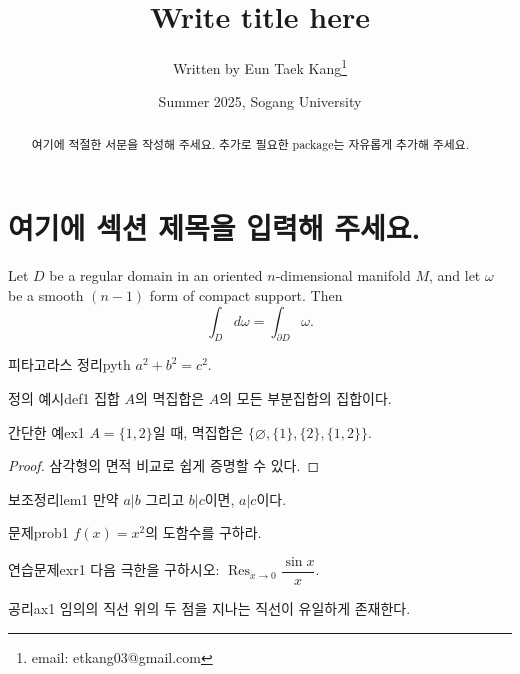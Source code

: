 \documentclass{article}
\title{\textsf{Write title here}}
\author[1]{Written by Eun Taek Kang\thanks{email: etkang03@gmail.com}}
\affil[1]{Department of Physics, Sogang University, Seoul 04107, Korea}
\date{Summer 2025, Sogang University}
\begin{document}
\pagestyle{fancy}
    \fancyhf{}
    \fancyfoot[C]{\thepage}

\maketitle

\begin{abstract}
    여기에 적절한 서문을 작성해 주세요. 추가로 필요한 package는 자유롭게 추가해 주세요.
\end{abstract}

\newpage

\section{여기에 섹션 제목을 입력해 주세요.}

\begin{theorem}{}{}
Let $D$ be a regular domain in an oriented $n$-dimensional manifold $M$, 
and let $\omega$ be a smooth $(n-1)$ form of compact support. Then
\[\int_D d\omega = \int_{\partial D} \omega.\]
\end{theorem}

\begin{theorem}{피타고라스 정리}{pyth}
$a^2+b^2=c^2$.
\end{theorem}

\begin{definition}{정의 예시}{def1}
집합 $A$의 멱집합은 $A$의 모든 부분집합의 집합이다.
\end{definition}

\begin{example}{간단한 예}{ex1}
$A=\{1,2\}$일 때, 멱집합은 $\{\varnothing,\{1\},\{2\},\{1,2\}\}$.
\end{example}

\begin{proof}
삼각형의 면적 비교로 쉽게 증명할 수 있다.
\end{proof}

\begin{lemma}{보조정리}{lem1}
만약 $a|b$ 그리고 $b|c$이면, $a|c$이다.
\end{lemma}

\begin{problem}{문제}{prob1}
$f(x)=x^2$의 도함수를 구하라.
\end{problem}

\begin{exercise}{연습문제}{exr1}
다음 극한을 구하시오: $\operatorname{Res}_{x\to 0} \dfrac{\sin x}{x}$.
\end{exercise}

\begin{axiom}{공리}{ax1}
임의의 직선 위의 두 점을 지나는 직선이 유일하게 존재한다.
\end{axiom}
\end{document}
